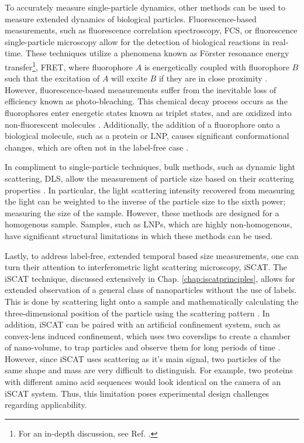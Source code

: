 To accurately measure single-particle dynamics, other methods can be used to measure extended dynamics of biological particles. Fluorescence-based measurements, such as fluorescence correlation spectroscopy, FCS, or fluorescence single-particle microscopy allow for the detection of biological reactions in real-time. These techniques utilize a phenomena known as Förster resonance energy transfer\footnote{For an in-depth discussion, see Ref. \cite{nelson2020biological}.}, FRET, where fluorophore $A$ is energetically coupled with fluorophore $B$ such that the excitation of $A$ will excite $B$ if they are in close proximity \cite{nelson2020biological}. However, fluorescence-based measurements suffer from the inevitable loss of efficiency known as photo-bleaching. This chemical decay process occurs as the fluorophores enter energetic states known as triplet states, and are oxidized into non-fluorescent molecules \cite{nelson2020biological}. Additionally, the addition of a fluorophore onto a biological molecule, such as a protein or LNP, causes significant conformational changes, which are often not in the label-free case \cite{sanchez-ricoEffectsFluorophoreAttachment2017}.

In compliment to single-particle techniques, bulk methods, such as dynamic light scattering, DLS, allow the measurement of particle size based on their scattering properties \cite{pereira_dynamic_2019}. In particular, the light scattering intensity recovered from measuring the light can be weighted to the inverse of the particle size to the sixth power; measuring the size of the sample. However, these methods are designed for a homogenous sample. Samples, such as LNPs, which are highly non-homogenous, have significant structural limitations in which these methods can be used. 

Lastly, to address label-free, extended temporal based size measurements, one can turn their attention to interferometric light scattering microscopy, iSCAT. The iSCAT technique, discussed extensively in Chap. \ref{chap:iscatprinciples}, allows for extended observation of a general class of nanoparticles without the use of labels. This is done by scattering light onto a sample and mathematically calculating the three-dimensional position of the particle using the scattering pattern \cite{taylor_interferometric_2018,leeCharacterizingTrackingSingle2007}. In addition, iSCAT can be paired with an artificial confinement system, such as convex-lens induced confinement, which uses two coverslips to create a chamber of nano-volume, to trap particles and observe them for long periods of time \cite{berardPrecisionPlatformConvex2013}. However, since iSCAT uses scattering as it's main signal, two particles of the same shape and mass are very difficult to distinguish. For example, two proteins with different amino acid sequences would look identical on the camera of an iSCAT system. Thus, this limitation poses experimental design challenges regarding applicability. 

